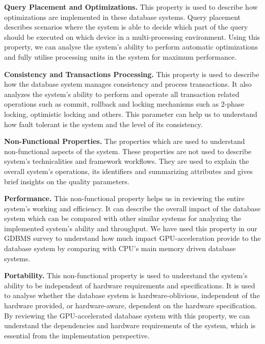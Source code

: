 \textbf{Query Placement and Optimizations.} This property is used to describe how optimizations are implemented in these database systems. Query placement describes scenarios where the system is able to decide which part of the query should be executed on which device in a multi-processing environment. Using this property, we can analyse the system's ability to perform automatic optimizations and fully utilise processing units in the system for maximum performance.

\textbf{Consistency and Transactions Processing.} This property is used to describe how the database system manages consistency and process transactions. It also analyzes the system's ability to perform and operate all transaction related operations such as commit, rollback and locking mechanisms such as 2-phase locking, optimistic locking and others. This parameter can help us to understand how fault tolerant is the system and the level of its consistency.
\newline

\textbf{Non-Functional Properties.} The properties which are used to understand non-functional aspects of the system. These properties are not used to describe system's technicalities and framework workflows. They are used to explain the overall system's operations, its identifiers and summarizing attributes and gives brief insights on the quality parameters.

\textbf{Performance.} This non-functional property helps us in reviewing the entire system's working and efficiency. It can describe the overall impact of the database system which can be compared with other similar systems for analyzing the implemented system's ability and throughput. We have used this property in our GDBMS survey to understand how much impact GPU-acceleration provide to the database system by comparing with CPU's main memory driven database systems.

\textbf{Portability.} This non-functional property is used to understand the system's ability to be independent of hardware requirements and specifications. It is used to analyse whether the database system is hardware-oblivious, independent of the hardware provided, or hardware-aware, dependent on the hardware specification. By reviewing the GPU-accelerated database system with this property, we can understand the dependencies and hardware requirements of the system, which is essential from the implementation perspective.

